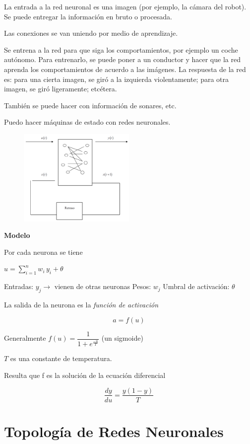 La entrada a la red neuronal es una imagen (por ejemplo, la cámara del robot). Se puede entregar la
información en bruto o procesada.

Las conexiones se van uniendo por medio de aprendizaje.

Se entrena a la red para que siga los comportamientos, por ejemplo un coche autónomo. Para entrenarlo, se
puede poner a un conductor y hacer que la red aprenda los comportamientos de acuerdo a las imágenes.
La respuesta de la red es: para una cierta imagen, se giró a la izquierda violentamente; para otra imagen, se
giró ligeramente; etcétera.

También se puede hacer con información de sonares, etc.

Puedo hacer máquinas de estado con redes neuronales.

\begin{figure}[h!]
	\centering
	\includegraphics[width=0.5\textwidth]{images/img73.png}
	\label{figura73}
\end{figure}

\textbf{Modelo}

Por cada neurona se tiene

$u = \displaystyle \sum_{i=1}^{n} w_i\, y_i + \theta $

Entradas: $ y_j \rightarrow $  vienen de otras neuronas
Pesos: $w_j$
Umbral de activación: $ \theta $

La salida de la neurona es la \textit{función de activación}

$$
a=f(u)
$$

Generalmente $ f(u) = \dfrac{1}{1 + e^\frac{-u}{T}}$ (un sigmoide)

$T$ es una constante de temperatura. 


Resulta que f es la solución de la ecuación diferencial 

$$
\dfrac{dy}{du} = \dfrac{y(1-y)}{T}
$$


\section{Topología de Redes Neuronales}

